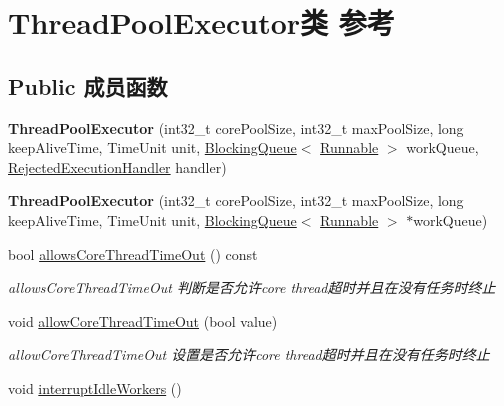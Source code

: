 \hypertarget{classThreadPoolExecutor}{}\section{Thread\+Pool\+Executor类 参考}
\label{classThreadPoolExecutor}
\subsection*{Public 成员函数}
\begin{DoxyCompactItemize}
\item 
\mbox{\label{classThreadPoolExecutor_a0a499781117adfc3827134a15446a561}} 
{\bfseries Thread\+Pool\+Executor} (int32\+\_\+t core\+Pool\+Size, int32\+\_\+t max\+Pool\+Size, long keep\+Alive\+Time, Time\+Unit unit, \hyperlink{classBlockingQueue}{Blocking\+Queue}$<$ \hyperlink{classRunnable}{Runnable} $>$ work\+Queue, \hyperlink{classRejectedExecutionHandler}{Rejected\+Execution\+Handler} handler)
\item 
\mbox{\label{classThreadPoolExecutor_a2ed1c726fb67fcd064c88e65bedf942d}} 
{\bfseries Thread\+Pool\+Executor} (int32\+\_\+t core\+Pool\+Size, int32\+\_\+t max\+Pool\+Size, long keep\+Alive\+Time, Time\+Unit unit, \hyperlink{classBlockingQueue}{Blocking\+Queue}$<$ \hyperlink{classRunnable}{Runnable} $>$ $\ast$work\+Queue)
\item 
bool \hyperlink{classThreadPoolExecutor_acb920195bb39c64c97ed0644693a3592}{allows\+Core\+Thread\+Time\+Out} () const
\begin{DoxyCompactList}\small\item\em allows\+Core\+Thread\+Time\+Out 判断是否允许core thread超时并且在没有任务时终止 \end{DoxyCompactList}\item 
void \hyperlink{classThreadPoolExecutor_aa700bdf61ac6f9a67411560af2871ee7}{allow\+Core\+Thread\+Time\+Out} (bool value)
\begin{DoxyCompactList}\small\item\em allow\+Core\+Thread\+Time\+Out 设置是否允许core thread超时并且在没有任务时终止 \end{DoxyCompactList}\item 
\mbox{\label{classThreadPoolExecutor_a25870bab59f0bdf17627f08b42f802f1}} 
void \hyperlink{classThreadPoolExecutor_a25870bab59f0bdf17627f08b42f802f1}{interrupt\+Idle\+Workers} ()

\end{DoxyCompactItemize}
